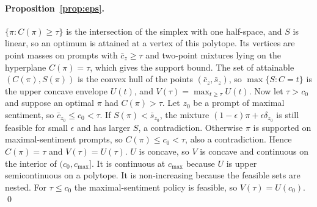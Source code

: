 \paragraph{Proposition~\ref{prop:eps}.}
$\{\pi : C(\pi) \ge \tau\}$ is the intersection of the simplex with one
half-space, and $S$ is linear, so an optimum is attained at a vertex of this
polytope. Its vertices are point masses on prompts with $\bar c_z \ge \tau$ and
two-point mixtures lying on the hyperplane $C(\pi) = \tau$, which gives the
support bound. The set of attainable $(C(\pi), S(\pi))$ is the convex hull of
the points $(\bar c_z, \bar s_z)$, so $\max\{S : C = t\}$ is the upper concave
envelope $U(t)$, and $V(\tau) = \max_{t \ge \tau} U(t)$. Now let $\tau > c_0$
and suppose an optimal $\pi$ had $C(\pi) > \tau$. Let $z_0$ be a prompt of
maximal sentiment, so $\bar c_{z_0} \le c_0 < \tau$. If $S(\pi) <
\bar s_{z_0}$, the mixture $(1-\epsilon)\pi + \epsilon\delta_{z_0}$ is still
feasible for small $\epsilon$ and has larger $S$, a contradiction. Otherwise
$\pi$ is supported on maximal-sentiment prompts, so $C(\pi) \le c_0 < \tau$, also
a contradiction. Hence $C(\pi) = \tau$ and $V(\tau) = U(\tau)$. $U$ is
concave, so $V$ is concave and continuous on the interior of
$(c_0, c_{\max}]$. It is continuous at $c_{\max}$ because $U$ is upper
semicontinuous on a polytope. It is non-increasing because the feasible sets are
nested. For $\tau \le c_0$ the maximal-sentiment policy is feasible, so
$V(\tau) = U(c_0)$. \qed

